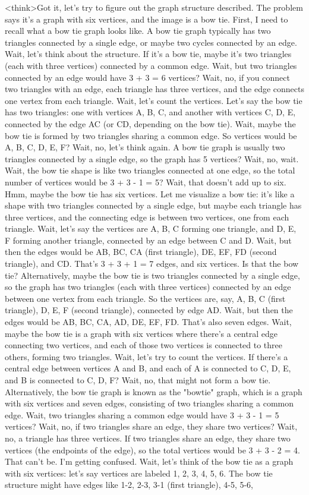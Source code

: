 <think>Got it, let's try to figure out the graph structure described. The problem says it's a graph with six vertices, and the image is a bow tie. First, I need to recall what a bow tie graph looks like. A bow tie graph typically has two triangles connected by a single edge, or maybe two cycles connected by an edge. Wait, let's think about the structure. If it's a bow tie, maybe it's two triangles (each with three vertices) connected by a common edge. Wait, but two triangles connected by an edge would have 3 + 3 = 6 vertices? Wait, no, if you connect two triangles with an edge, each triangle has three vertices, and the edge connects one vertex from each triangle. Wait, let's count the vertices. Let's say the bow tie has two triangles: one with vertices A, B, C, and another with vertices C, D, E, connected by the edge AC (or CD, depending on the bow tie). Wait, maybe the bow tie is formed by two triangles sharing a common edge. So vertices would be A, B, C, D, E, F? Wait, no, let's think again. A bow tie graph is usually two triangles connected by a single edge, so the graph has 5 vertices? Wait, no, wait. Wait, the bow tie shape is like two triangles connected at one edge, so the total number of vertices would be 3 + 3 - 1 = 5? Wait, that doesn't add up to six. Hmm, maybe the bow tie has six vertices. Let me visualize a bow tie: it's like a shape with two triangles connected by a single edge, but maybe each triangle has three vertices, and the connecting edge is between two vertices, one from each triangle. Wait, let's say the vertices are A, B, C forming one triangle, and D, E, F forming another triangle, connected by an edge between C and D. Wait, but then the edges would be AB, BC, CA (first triangle), DE, EF, FD (second triangle), and CD. That's 3 + 3 + 1 = 7 edges, and six vertices. Is that the bow tie? Alternatively, maybe the bow tie is two triangles connected by a single edge, so the graph has two triangles (each with three vertices) connected by an edge between one vertex from each triangle. So the vertices are, say, A, B, C (first triangle), D, E, F (second triangle), connected by edge AD. Wait, but then the edges would be AB, BC, CA, AD, DE, EF, FD. That's also seven edges. Wait, maybe the bow tie is a graph with six vertices where there's a central edge connecting two vertices, and each of those two vertices is connected to three others, forming two triangles. Wait, let's try to count the vertices. If there's a central edge between vertices A and B, and each of A is connected to C, D, E, and B is connected to C, D, F? Wait, no, that might not form a bow tie. Alternatively, the bow tie graph is known as the "bowtie" graph, which is a graph with six vertices and seven edges, consisting of two triangles sharing a common edge. Wait, two triangles sharing a common edge would have 3 + 3 - 1 = 5 vertices? Wait, no, if two triangles share an edge, they share two vertices? Wait, no, a triangle has three vertices. If two triangles share an edge, they share two vertices (the endpoints of the edge), so the total vertices would be 3 + 3 - 2 = 4. That can't be. I'm getting confused. Wait, let's think of the bow tie as a graph with six vertices: let's say vertices are labeled 1, 2, 3, 4, 5, 6. The bow tie structure might have edges like 1-2, 2-3, 3-1 (first triangle), 4-5, 5-6, 